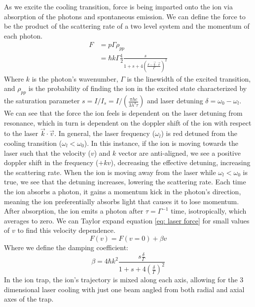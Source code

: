 As we excite the cooling transition, force is being imparted onto the ion via absorption of the photons and spontaneous emission. We can define the force to be the product of the scattering rate of a two level system and the momentum of each photon.
\begin{align}
	F & = p \Gamma \rho_{pp} \nonumber \\
	& = \hbar k \Gamma \frac{1}{2} \frac{s}{1+s+4\left(\frac{\delta-\vec{k}\cdot \vec{v}}{\Gamma}\right)^2} \label{eq: laser force}
\end{align}
Where $k$ is the photon's wavenumber, $\Gamma$ is the linewidth of the excited transition, and $\rho_{pp}$ is the probability of finding the ion in the excited  state characterized by the saturation parameter $s = I/I_s=I/(\frac{\pi h c}{3 \lambda^3 \tau})$ and laser detuning $\delta=\omega_0-\omega_l$. We can see that the force the ion feels is dependent on the laser detuning from resonance, which in turn is dependent on the doppler shift of the ion with respect to the laser $\vec{k} \cdot \vec{v}$. In general, the laser frequency ($\omega_l$) is red detuned from the cooling transition ($\omega_l < \omega_0$). In this instance, if the ion is moving towards the laser such that the velocity ($v$) and $k$ vector are anti-aligned, we see a positive doppler shift in the frequency ($+kv$), decreasing the effective detuning, increasing the scattering rate. When the ion is moving away from the laser while $\omega_l < \omega_0$ is true, we see that the detuning increases, lowering the scattering rate. Each time the ion absorbs a photon, it gains a momentum kick in the photon's direction, meaning the ion preferentially absorbs light that causes it to lose momentum. After absorption, the ion emits a photon after $\tau=\Gamma^{-1}$ time, isotropically, which averages to zero. We can Taylor expand equation \ref{eq: laser force} for small values of $v$ to find this velocity dependence.
\begin{equation*}
	F(v) = F(v=0) + \beta v
\end{equation*}
Where we define the damping coefficient:
\begin{equation*}
	\beta= 4 \hbar k^2 \frac{s \frac{\delta}{\Gamma}}{1+s+4\left(\frac{\delta}{\Gamma}\right)^2}
\end{equation*}
In the ion trap, the ion's trajectory is mixed along each axis, allowing for the 3 dimensional laser cooling with just one beam angled from both radial and axial axes of the trap.

